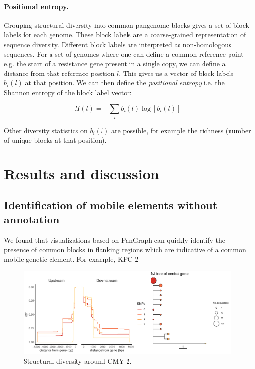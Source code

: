 \documentclass[aps,rmp,preprint,superscriptaddress,10pt,twocolumn]{revtex4-1}
\begin{document}
\paragraph*{Positional entropy.} Grouping structural diversity into common pangenome blocks gives a set of block labels for each genome. These block labels are a coarse-grained representation of sequence diversity. Different block labels are interpreted as non-homologous sequences. For a set of genomes where one can define a common reference point e.g. the start of a resistance gene present in a single copy, we can define a distance from that reference position $l$. This gives us a vector of block labels $b_i(l)$ at that position. We can then define the \textit{positional entropy} i.e. the Shannon entropy of the block label vector:

$$
H(l) = - \sum_i b_i(l) \log[b_i(l)]
$$

Other diversity statistics on $b_i(l)$ are possible, for example the richness (number of unique blocks at that position). 


\section{Results and discussion}

\subsection{Identification of mobile elements without annotation}

We found that visualizations based on PanGraph can quickly identify the presence of common blocks in flanking regions which are indicative of a common mobile genetic element. For example, KPC-2 

\begin{figure}
    \centering
    \includegraphics[width=\linewidth]{figs/CMY-2-mmseqs2-polish.all_u5000_d5000_pangraph.json.output_dists.csv.flanking-plot-output-focal-gene-seq.pdf}
    \caption{Structural diversity around CMY-2.}
    \label{fig:CMY-2}
\end{figure}
\end{document}
